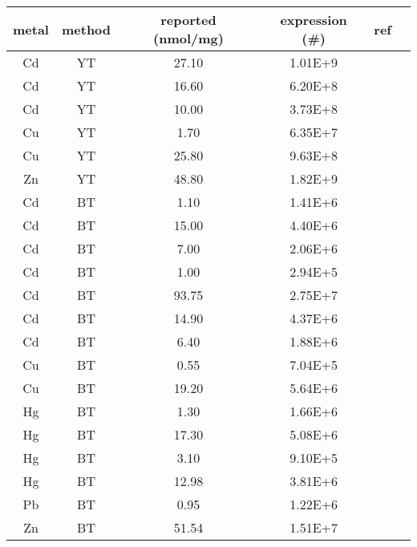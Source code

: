 \begin{tabular}{cccccl}
	\toprule
	metal & method & reported (nmol/mg) & expression (\#) & ref \\
	\midrule
	Cd & YT & 27.10 & 1.01E+9 & \cite{kuroda2003bioadsorption} \\
	Cd & YT & 16.60 & 6.20E+8 & \cite{kuroda2003bioadsorption} \\
	Cd & YT & 10.00 & 3.73E+8 & \cite{kuroda2006} \\
	Cu & YT & 1.70 & 6.35E+7 & \cite{kuroda2001cell} \\
	Cu & YT & 25.80 & 9.63E+8 & \cite{ruta2017} \\
	Zn & YT & 48.80 & 1.82E+9 & \cite{ruta2017} \\
	Cd & BT & 1.10 & 1.41E+6 & \cite{pazirandeh1998} \\
	Cd & BT & 15.00 & 4.40E+6 & \cite{sousa1996enhanced} \\
	Cd & BT & 7.00 & 2.06E+6 & \cite{sousa1996enhanced} \\
	Cd & BT & 1.00 & 2.94E+5 & \cite{sousa1996enhanced} \\
	Cd & BT & 93.75 & 2.75E+7 & \cite{yoshida2002} \\
	Cd & BT & 14.90 & 4.37E+6 & \cite{kuroda2003bioadsorption} \\
	Cd & BT & 6.40 & 1.88E+6 & \cite{kuroda2003} \\
	Cu & BT & 0.55 & 7.04E+5 & \cite{pazirandeh1998} \\
	Cu & BT & 19.20 & 5.64E+6 & \cite{yoshida2002} \\
	Hg & BT & 1.30 & 1.66E+6 & \cite{pazirandeh1998} \\
	Hg & BT & 17.30 & 5.08E+6 & \cite{bae2003} \\
	Hg & BT & 3.10 & 9.10E+5 & \cite{bae2003} \\
	Hg & BT & 12.98 & 3.81E+6 & \cite{bae2003} \\
	Pb & BT & 0.95 & 1.22E+6 & \cite{pazirandeh1998} \\
	Zn & BT & 51.54 & 1.51E+7 & \cite{yoshida2002} \\
	\bottomrule
\end{tabular}
